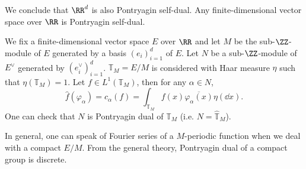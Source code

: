 \begin{remark}
    We conclude that $\RR^d$ is also Pontryagin self-dual.
    Any finite-dimensional vector space over $\RR$ is Pontryagin self-dual.
\end{remark}

\begin{exampleenv}
    We fix a finite-dimensional vector space $E$ over $\RR$ and let $M$ be the sub-$\ZZ$-module of $E$ generated by a basis $(e_i)_{i=1}^{d}$ of $E$.
    Let $N$ be a sub-$\ZZ$-module of $E^\vee$ generated by $(e^\vee_i)_{i=1}^{d}$.
    $\mathbb{T}_{M} = E/M$ is considered with Haar measure $\eta$ such that $\eta(\mathbb{T}_{M}) = 1$.
    Let $f \in L^1(\mathbb{T}_{M})$, then for any $\alpha \in N$,
    $$\hat{f} (\varphi_{\alpha}) = c_{\alpha}(f) = \int_{\mathbb{T}_{M}} f(x) \overline{\varphi_{\alpha}(x)} \eta(\dd x).$$
    One can check that $N$ is Pontryagin dual of $\mathbb{T}_{M}$ (i.e. $N = \hat{\mathbb{T}}_{M}$).

    \quad In general, one can speak of Fourier series of a $M$-periodic function when we deal with a compact $E/M$.
    From the general theory, Pontryagin dual of a compact group is discrete.
\end{exampleenv}
